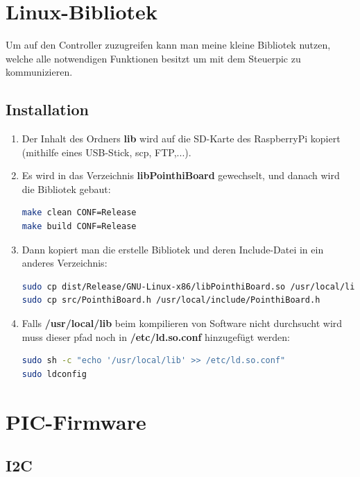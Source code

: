 \documentclass[a4paper,10pt]{article}
\newcommand{\path}[1]{\textcolor{pathcolor}{\textbf{#1}}} %
\begin{document}
\newpage
\section{Linux-Bibliotek}

Um auf den Controller zuzugreifen kann man meine kleine Bibliotek nutzen, welche alle notwendigen Funktionen besitzt um mit dem Steuerpic zu kommunizieren.

\subsection{Installation}

\begin{enumerate}
 \item Der Inhalt des Ordners \path{lib} wird auf die SD-Karte des RaspberryPi kopiert (mithilfe eines USB-Stick, scp, FTP,...).
 
 \item Es wird in das Verzeichnis \path{libPointhiBoard} gewechselt, und danach wird die Bibliotek gebaut:
    \begin{lstlisting}[language=sh]
make clean CONF=Release
make build CONF=Release
    \end{lstlisting}
    
  \item Dann kopiert man die erstelle Bibliotek und deren Include-Datei in ein anderes Verzeichnis:
    \begin{lstlisting}[language=sh]
sudo cp dist/Release/GNU-Linux-x86/libPointhiBoard.so /usr/local/lib/libPointhiBoard.so
sudo cp src/PointhiBoard.h /usr/local/include/PointhiBoard.h
    \end{lstlisting}
    
  \item Falls \path{/usr/local/lib} beim kompilieren von Software nicht durchsucht wird muss dieser pfad noch in \path{/etc/ld.so.conf} hinzugefügt werden:
    \begin{lstlisting}[language=sh]
sudo sh -c "echo '/usr/local/lib' >> /etc/ld.so.conf"
sudo ldconfig
    \end{lstlisting}   
    
\end{enumerate}

\newpage
\section{PIC-Firmware}

\subsection{I2C}
\end{document}
